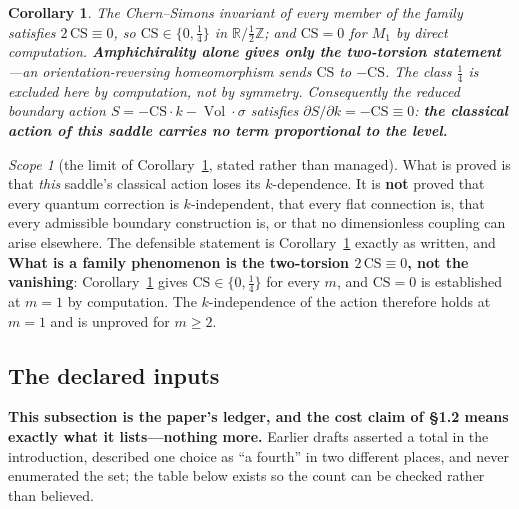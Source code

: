 \documentclass[11pt,reqno]{amsart}
\theoremstyle{plain}
\newtheorem{corollary}[theorem]{Corollary}
\theoremstyle{definition}
\theoremstyle{remark}
\newtheorem{scope}[theorem]{Scope}
\newcommand{\Z}{\mathbb{Z}}
\newcommand{\R}{\mathbb{R}}
\newcommand{\Vol}{\operatorname{Vol}}
\begin{document}
\begin{corollary}\label{cor:cs}
The Chern--Simons invariant of every member of the family satisfies
$2\,\mathrm{CS}\equiv0$, so $\mathrm{CS}\in\{0,\tfrac14\}$ in $\R/\tfrac12\Z$; and
$\mathrm{CS}=0$ for $M_1$ by direct computation. \textbf{Amphichirality alone gives only
the two-torsion statement}---an orientation-reversing homeomorphism sends
$\mathrm{CS}$ to $-\mathrm{CS}$. The class $\tfrac14$ is excluded here by
computation, not by symmetry. Consequently the reduced boundary action
$S=-\mathrm{CS}\cdot k-\Vol\cdot\sigma$ satisfies
$\partial S/\partial k=-\mathrm{CS}\equiv0$: \textbf{the classical action of this saddle
carries no term proportional to the level.}
\end{corollary}

\begin{scope}[the limit of Corollary~\ref{cor:cs}, stated rather than managed]\label{sc:scale}
What is proved is that \emph{this} saddle's classical action loses its
$k$-dependence. It is \textbf{not} proved that every quantum correction is
$k$-independent, that every flat connection is, that every admissible boundary
construction is, or that no dimensionless coupling can arise elsewhere. The defensible
statement is Corollary~\ref{cor:cs} exactly as written, and \textbf{What is a family phenomenon is the two-torsion
$2\,\mathrm{CS}\equiv0$, not the vanishing}: Corollary~\ref{cor:cs} gives
$\mathrm{CS}\in\{0,\tfrac14\}$ for every $m$, and $\mathrm{CS}=0$ is established at
$m=1$ by computation. The $k$-independence of the action therefore holds at $m=1$ and is
unproved for $m\ge2$.
\end{scope}

\subsection{The declared inputs}\label{sec:inputs}

\textbf{This subsection is the paper's ledger, and the cost claim of \S1.2 means exactly
what it lists---nothing more.} Earlier drafts asserted a total in the introduction,
described one choice as ``a fourth'' in two different places, and never enumerated the
set; the table below exists so the count can be checked rather than believed.
\end{document}
